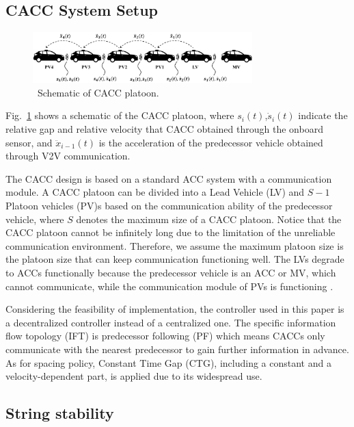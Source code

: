 \documentclass[journal]{IEEEtran}
\begin{document}
\subsection{CACC System Setup}
\label{Section 2.1}

\begin{figure}
  \centering
  \includegraphics[width=8.5cm]{figs/fig1.png}
  \caption{~Schematic of CACC platoon.}
  \label{fig1}
\end{figure}

Fig.~\ref{fig1} shows a schematic of the CACC platoon, where $s_i (t)$,$\dot{s}_{i} (t)$ indicate the relative gap and relative velocity that CACC obtained through the onboard sensor, and $\ddot{x}_{i-1} (t)$ is the acceleration of the predecessor vehicle obtained through V2V communication.

The CACC design is based on a standard ACC system with a communication module. A CACC platoon can be divided into a Lead Vehicle (LV) and $S-1$ Platoon vehicles (PV)s based on the communication ability of the predecessor vehicle, where $S$ denotes the maximum size of a CACC platoon. Notice that the CACC platoon cannot be infinitely long due to the limitation of the unreliable communication environment. Therefore, we assume the maximum platoon size is the platoon size that can keep communication functioning well. The LVs degrade to ACCs functionally because the predecessor vehicle is an ACC or MV, which cannot communicate, while the communication module of PVs is functioning \citep{dey2015review,navas2019mixing}.

Considering the feasibility of implementation, the controller used in this paper is a decentralized controller instead of a centralized one. The specific information flow topology (IFT) is predecessor following (PF) which means CACCs only communicate with the nearest predecessor to gain further information in advance. As for spacing policy, Constant Time Gap (CTG), including a constant and a velocity-dependent part, is applied due to its widespread use.

\subsection{String stability}
\label{Section 2.2}
\end{document}
